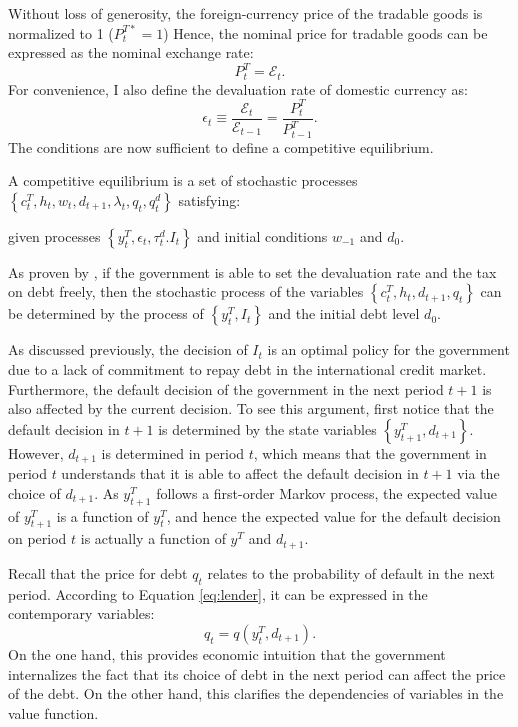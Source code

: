 Without loss of generosity, the foreign-currency price of the tradable goods is normalized to 1 ($P^{T*}_t = 1$)
Hence, the nominal price for tradable goods can be expressed as the nominal exchange rate:
\begin{equation}
    \label{eq:price-exrate}
    P^T_t = \mathcal{E}_t.
\end{equation}
For convenience, I also define the devaluation rate of domestic currency as:
\begin{equation}
    \label{eq:devaluation-rate}
    \epsilon_t \equiv \frac{\mathcal{E}_t}{\mathcal{E}_{t-1}} = \frac{P^T_t}{P^T_{t-1}}.
\end{equation}
The conditions are now sufficient to define a competitive equilibrium.
\begin{definition}
    A competitive equilibrium is a set of stochastic processes $\left\{ c^T_t, h_t, w_t, d_{t+1}, \lambda_t, q_t, q^d_t \right\}$ satisfying:
    
    given processes $\left\{ y^T_t, \epsilon_t, \tau^d_t. I_t \right\}$ and initial conditions $w_{-1}$ and $d_0$.
\end{definition}
As proven by \citet{Na-18}, if the government is able to set the devaluation rate and the tax on debt freely, then the stochastic process of the variables $\left\{ c^T_t, h_t, d_{t+1}, q_t \right\}$ can be determined by the process of $\left\{ y^T_t, I_t\right\}$ and the initial debt level $d_0$.

As discussed previously, the decision of $I_t$ is an optimal policy for the government due to a lack of commitment to repay debt in the international credit market. Furthermore, the default decision of the government in the next period $t+1$ is also affected by the current decision. To see this argument, first notice that the default decision in $t+1$ is determined by the state variables $\left\{ y^T_{t+1}, d_{t+1} \right\}$. However, $d_{t+1}$ is determined in period $t$, which means that the government in period $t$ understands that it is able to affect the default decision in $t+1$ via the choice of $d_{t+1}$. As $y^T_{t+1}$ follows a first-order Markov process, the expected value of $y^T_{t+1}$ is a function of $y^T_t$, and hence the expected value for the default decision on period $t$ is actually a function of $y^T$ and $d_{t+1}$.

Recall that the price for debt $q_t$ relates to the probability of default in the next period. According to Equation \eqref{eq:lender}, it can be expressed in the contemporary variables:
\begin{equation}
    q_t = q(y^T_t, d_{t+1}).
\end{equation}
On the one hand, this provides economic intuition that the government internalizes the fact that its choice of debt in the next period can affect the price of the debt. On the other hand, this clarifies the dependencies of variables in the value function.
